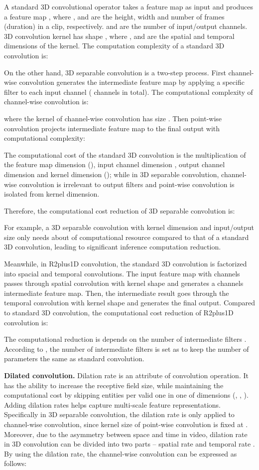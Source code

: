 \documentclass{bmvc2k}
\begin{document}
A standard 3D convolutional operator takes a  feature map  as input and produces a  feature map , where ,  and  are the height, width and number of frames (duration) in a clip, respectively.  and  are the number of input/output channels. 
3D convolution kernel has shape , 
where ,  and  are the spatial and temporal dimensions of the kernel. 
The computation complexity of a standard 3D convolution is:

On the other hand, 3D separable convolution is a two-step process. First channel-wise convolution generates the intermediate feature map by applying a specific filter to each input channel ( channels in total).  The computational complexity of channel-wise convolution is:

where the kernel of channel-wise convolution has size . Then point-wise convolution projects intermediate feature map to the final output with computational complexity:


The computational cost of the standard 3D convolution is the multiplication of the feature map dimension (), input channel dimension , output channel dimension  and kernel dimension (); while in 3D separable convolution, channel-wise convolution is irrelevant to output filters and point-wise convolution is isolated from kernel dimension. 

Therefore, the computational cost reduction of 3D separable convolution is:


For example, a 3D separable convolution with  kernel dimension and  input/output size only needs about  of computational resource compared to that of a standard 3D convolution, leading to significant inference computation reduction.

Meanwhile, in R2plus1D convolution, the standard 3D convolution is factorized into spacial and temporal convolutions. The input feature map with  channels passes through spatial convolution with kernel shape  and generates a  channels intermediate feature map. Then, the intermediate result goes through the temporal convolution with kernel shape  and generates the final output. Compared to standard 3D convolution, the computational cost reduction of R2plus1D convolution is:

The computational reduction is depends on the number of intermediate filters . According to \cite{r2plus1d_cvpr18}, the number of intermediate filters is set as  to keep the number of parameters the same as standard convolution.

\textbf{Dilated convolution.} Dilation rate  is an attribute of convolution operation. It has the ability to increase the receptive field size, while maintaining the computational cost by skipping  entities per valid one in one of dimensions (, , ). Adding dilation rates helps capture multi-scale feature representations. Specifically in 3D separable convolution, the dilation rate is only applied to channel-wise convolution, since kernel size of point-wise convolution is fixed at . Moreover, due to the asymmetry between space and time in video, dilation rate in 3D convolution can be divided into two parts -- spatial rate  and temporal rate . By using the dilation rate, the channel-wise convolution can be expressed as follows:
\end{document}
